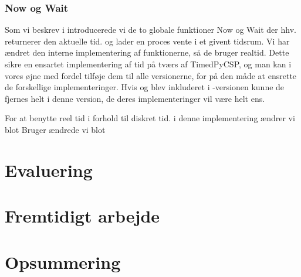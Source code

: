 \subsubsection{Now og Wait}
Som vi beskrev i \des introducerede vi de to globale funktioner Now og Wait der hhv. returnerer den aktuelle tid. og lader en proces vente i et givent tidsrum. Vi har ændret den interne implementering af funktionerne, så de bruger realtid. Dette sikre en ensartet implementering af tid på tværs af TimedPyCSP, og man kan i vores øjne med fordel tilføje dem til alle \pycsp versionerne, for på den måde at ensrette de forskellige implementeringer. Hvis  og  blev inkluderet i -versionen kunne de fjernes helt i denne version, de deres implementeringer vil være helt ens. 

For at benytte reel tid i forhold til diskret tid. i denne implementering ændrer vi blot Bruger ændrede vi blot 

    
  \section{Evaluering}
  \section{Fremtidigt arbejde}
  \section{Opsummering}
